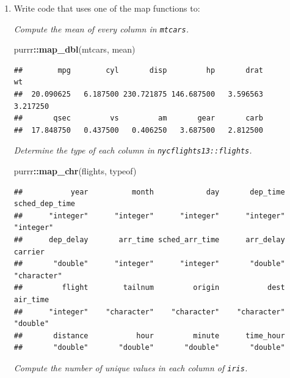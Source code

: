 \documentclass[]{book}
\newenvironment{Shaded}{\begin{snugshade}}{\end{snugshade}}
\newcommand{\KeywordTok}[1]{\textcolor[rgb]{0.13,0.29,0.53}{\textbf{#1}}}
\newcommand{\NormalTok}[1]{#1}
\newcommand{\OperatorTok}[1]{\textcolor[rgb]{0.81,0.36,0.00}{\textbf{#1}}}
\newcommand{\StringTok}[1]{\textcolor[rgb]{0.31,0.60,0.02}{#1}}
\theoremstyle{definition}
\theoremstyle{definition}
\theoremstyle{definition}
\theoremstyle{remark}
\begin{document}
\begin{enumerate}
\def\labelenumi{\arabic{enumi}.}
\item
  Write code that uses one of the map functions to:

  \emph{Compute the mean of every column in \texttt{mtcars}.}

\begin{Shaded}
\begin{Highlighting}[]
\NormalTok{purrr}\OperatorTok{::}\KeywordTok{map_dbl}\NormalTok{(mtcars, mean)}
\end{Highlighting}
\end{Shaded}

\begin{verbatim}
##        mpg        cyl       disp         hp       drat         wt 
##  20.090625   6.187500 230.721875 146.687500   3.596563   3.217250 
##       qsec         vs         am       gear       carb 
##  17.848750   0.437500   0.406250   3.687500   2.812500
\end{verbatim}

  \emph{Determine the type of each column in
  \texttt{nycflights13::flights}.}

\begin{Shaded}
\begin{Highlighting}[]
\NormalTok{purrr}\OperatorTok{::}\KeywordTok{map_chr}\NormalTok{(flights, typeof)}
\end{Highlighting}
\end{Shaded}

\begin{verbatim}
##           year          month            day       dep_time sched_dep_time 
##      "integer"      "integer"      "integer"      "integer"      "integer" 
##      dep_delay       arr_time sched_arr_time      arr_delay        carrier 
##       "double"      "integer"      "integer"       "double"    "character" 
##         flight        tailnum         origin           dest       air_time 
##      "integer"    "character"    "character"    "character"       "double" 
##       distance           hour         minute      time_hour 
##       "double"       "double"       "double"       "double"
\end{verbatim}

  \emph{Compute the number of unique values in each column of
  \texttt{iris}.}

\begin{Shaded}
\end{Shaded}


\end{enumerate}
\end{document}
